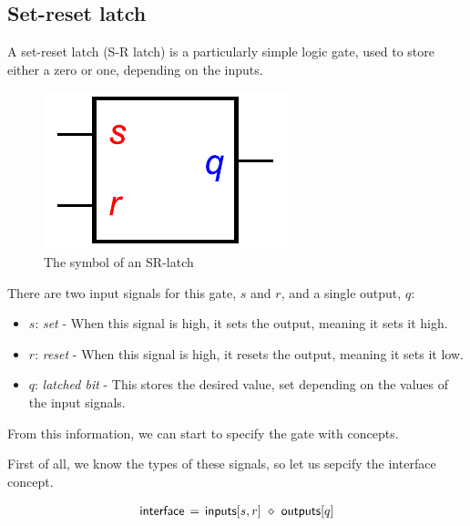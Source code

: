 \documentclass[british, journal]{IEEEtran}
\begin{document}
\subsection{Set-reset latch \label{sub:srlatch}}

A set-reset latch (S-R latch) is a particularly simple logic gate, used to store either a zero or one,
depending on the inputs. 

\vspace{-3mm}

\begin{figure}[h]
\begin{centering}
\includegraphics[scale=0.51]{Images/sr-latch-circuit}
\par\end{centering}
\vspace{-1mm}
\protect\caption{\label{fig:sr-latch-circuit} The symbol of an SR-latch}
\vspace{-5mm}
\end{figure}

\noindent There are two input signals for this gate, $s$ and $r$, and a single output, $q$: 

\begin{itemize}
  \item $s$: \emph{set} - When this signal is high, it sets the output, meaning it sets it high.
  \item $r$: \emph{reset} - When this signal is high, it resets the output, meaning it sets it low.
  \item $q$: \emph{latched bit} - This stores the desired value, set depending on the values of the input signals.
\end{itemize}

\noindent From this information, we can start to specify the gate with concepts.

First of all, we know the types of these signals, so let us sepcify the interface concept.

\[
\begin{array}{lcl}
\mathsf{interface}&\hspace{-2mm}=&\hspace{-2mm}\mathsf{inputs}[s, r]~\diamond~\mathsf{outputs}[q]
\end{array}
\]
\end{document}
